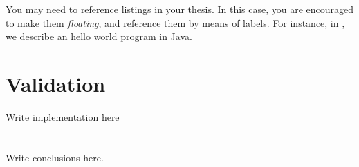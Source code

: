 \documentclass[12pt,a4paper,openright,twoside]{book}
\begin{document}
You may need to reference listings in your thesis.
%
In this case, you are encouraged to make them \emph{floating}, and reference them by means of labels.
%
For instance, in , we describe an hello world program in Java.

\chapter{Validation} %
\label{chap:validation}

Write implementation here

\chapter{\conclusionsname}
\label{chap:conclusions}

Write conclusions here.





\end{document}
